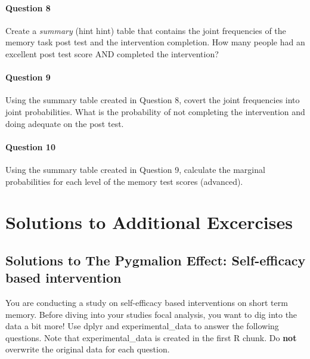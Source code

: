 \documentclass[]{book}
\theoremstyle{definition}
\theoremstyle{definition}
\theoremstyle{definition}
\theoremstyle{remark}
\begin{document}
\hypertarget{question-8}{%
\subsection{Question 8}\label{question-8}}

Create a \emph{summary} (hint hint) table that contains the joint frequencies of the memory task post test and the intervention completion. How many people had an excellent post test score AND completed the intervention?

\hypertarget{question-9}{%
\subsection{Question 9}\label{question-9}}

Using the summary table created in Question 8, covert the joint frequencies into joint probabilities. What is the probability of not completing the intervention and doing adequate on the post test.

\hypertarget{question-10}{%
\subsection{Question 10}\label{question-10}}

Using the summary table created in Question 9, calculate the marginal probabilities for each level of the memory test scores (advanced).

\hypertarget{part-solutions-to-additional-excercises}{%
\part{Solutions to Additional Excercises}\label{part-solutions-to-additional-excercises}}

\hypertarget{solutions-to-the-pygmalion-effect-self-efficacy-based-intervention}{%
\chapter{Solutions to The Pygmalion Effect: Self-efficacy based intervention}\label{solutions-to-the-pygmalion-effect-self-efficacy-based-intervention}}

You are conducting a study on self-efficacy based interventions on short term memory. Before diving into your studies focal analysis, you want to dig into the data a bit more! Use dplyr and experimental\_data to answer the following questions. Note that experimental\_data is created in the first R chunk. Do \textbf{not} overwrite the original data for each question.
\end{document}
